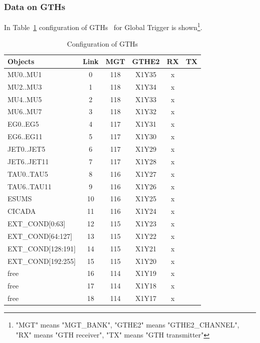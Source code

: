 \begin{longtable}{|l|c|c|c|c|c|c|c|l|}
\end{longtable}

\clearpage

\subsubsection{Data on GTHs}\label{sec:app:gth_conf_table}

In Table~\ref{tab:app:gth_conf} configuration of GTHs~\cite{GTHs} for Global Trigger is shown\footnote{"MGT" means "MGT\_BANK", "GTHE2" means "GTHE2\_CHANNEL", "RX" means "GTH receiver", "TX" means "GTH transmitter"}.

\begin{longtable}{|l|c|c|c|c|c|}
\caption{Configuration of GTHs}
    \label{tab:app:gth_conf}\\
\hline
\textbf{Objects}& \textbf{Link}& \textbf{MGT}& \textbf{GTHE2}& \textbf{RX}& \textbf{TX}\\
\hline
\hline
\endhead
MU0..MU1  & 0  & 118 & X1Y35 & x &   \\\hline
MU2..MU3  & 1  & 118 & X1Y34 & x &   \\\hline
MU4..MU5  & 2  & 118 & X1Y33 & x &   \\\hline
MU6..MU7  & 3  & 118 & X1Y32 & x &   \\\hline
EG0..EG5  & 4  & 117 & X1Y31 & x &   \\\hline
EG6..EG11 & 5  & 117 & X1Y30 & x &   \\\hline
JET0..JET5  & 6  & 117 & X1Y29 & x &   \\\hline
JET6..JET11 & 7  & 117 & X1Y28 & x &   \\\hline
TAU0..TAU5  & 8  & 116 & X1Y27 & x &   \\\hline
TAU6..TAU11 & 9  & 116 & X1Y26 & x &   \\\hline
ESUMS  & 10  & 116 & X1Y25 & x &   \\\hline
CICADA & 11  & 116 & X1Y24 & x &   \\\hline
EXT\_COND[0:63] & 12  & 115 & X1Y23 & x &   \\\hline
EXT\_COND[64:127] & 13  & 115 & X1Y22 & x &   \\\hline
EXT\_COND[128:191] & 14  & 115 & X1Y21 & x &   \\\hline
EXT\_COND[192:255] & 15  & 115 & X1Y20 & x &   \\\hline
free & 16  & 114 & X1Y19 & x &   \\\hline
free & 17  & 114 & X1Y18 & x &   \\\hline
free & 18  & 114 & X1Y17 & x &   \\\hline

\end{longtable}
